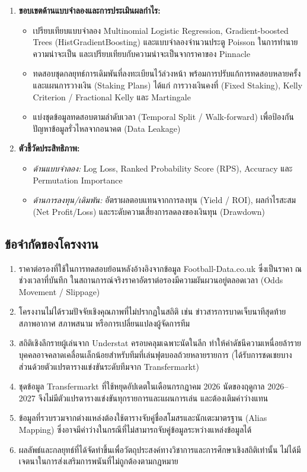 \begin{enumerate}[label=\arabic*)]
    \item \textbf{ขอบเขตด้านแบบจำลองและการประเมินผลกำไร:}
    \begin{itemize}
        \item เปรียบเทียบแบบจำลอง Multinomial Logistic Regression, Gradient-boosted Trees (HistGradientBoosting) และแบบจำลองจำนวนประตู Poisson ในการทำนายความน่าจะเป็น และเปรียบเทียบกับความน่าจะเป็นจากราคาของ Pinnacle
        \item ทดสอบชุดกลยุทธ์การเดิมพันที่ลงทะเบียนไว้ล่วงหน้า พร้อมการปรับแก้การทดสอบหลายครั้ง และแผนการวางเงิน (Staking Plans) ได้แก่ การวางเงินคงที่ (Fixed Staking), Kelly Criterion / Fractional Kelly และ Martingale
        \item แบ่งชุดข้อมูลทดสอบตามลำดับเวลา (Temporal Split / Walk-forward) เพื่อป้องกันปัญหาข้อมูลรั่วไหลจากอนาคต (Data Leakage)
    \end{itemize}

    \item \textbf{ตัวชี้วัดประสิทธิภาพ:} 
    \begin{itemize}
        \item \textit{ด้านแบบจำลอง:} Log Loss, Ranked Probability Score (RPS), Accuracy และ Permutation Importance
        \item \textit{ด้านการลงทุน/เดิมพัน:} อัตราผลตอบแทนจากการลงทุน (Yield / ROI), ผลกำไรสะสม (Net Profit/Loss) และระดับความเสี่ยงการลดลงของเงินทุน (Drawdown)
    \end{itemize}
\end{enumerate}

\subsection{ข้อจำกัดของโครงงาน}

\begin{enumerate}[label=\arabic*)]
    \item ราคาต่อรองที่ใช้ในการทดสอบย้อนหลังอ้างอิงจากข้อมูล Football-Data.co.uk ซึ่งเป็นราคา ณ ช่วงเวลาที่บันทึก ในสถานการณ์จริงราคาอัตราต่อรองมีความผันผวนอยู่ตลอดเวลา (Odds Movement / Slippage)
    \item โครงงานไม่ได้รวมปัจจัยเชิงคุณภาพที่ไม่ปรากฏในสถิติ เช่น ข่าวสารการบาดเจ็บนาทีสุดท้าย สภาพอากาศ สภาพสนาม หรือการเปลี่ยนแปลงผู้จัดการทีม
    \item สถิติเชิงลึกรายผู้เล่นจาก Understat ครอบคลุมเฉพาะนัดในลีก ทำให้ค่าดัชนีความเหนื่อยล้ารายบุคคลอาจคลาดเคลื่อนเล็กน้อยสำหรับทีมที่เล่นฟุตบอลถ้วยหลายรายการ (ได้รับการชดเชยบางส่วนด้วยตัวแปรตารางแข่งขันระดับทีมจาก Transfermarkt)
    \item ชุดข้อมูล Transfermarkt ที่ใช้หยุดอัปเดตในเดือนกรกฎาคม 2026 นัดของฤดูกาล 2026--2027 จึงไม่มีตัวแปรตารางแข่งขันทุกรายการและแผนการเล่น และต้องเติมค่าว่างแทน
    \item ข้อมูลที่รวบรวมจากต่างแหล่งต้องใช้ตารางจับคู่ชื่อสโมสรและนักเตะมาตรฐาน (Alias Mapping) ซึ่งอาจมีค่าว่างในกรณีที่ไม่สามารถจับคู่ข้อมูลระหว่างแหล่งข้อมูลได้
    \item ผลลัพธ์และกลยุทธ์ที่ได้จัดทำขึ้นเพื่อวัตถุประสงค์ทางวิชาการและการศึกษาเชิงสถิติเท่านั้น ไม่ได้มีเจตนาในการส่งเสริมการพนันที่ไม่ถูกต้องตามกฎหมาย
\end{enumerate}

